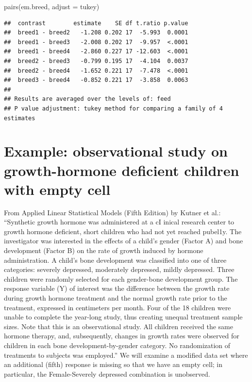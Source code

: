 \documentclass[
]{book}
\newenvironment{Shaded}{\begin{snugshade}}{\end{snugshade}}
\newcommand{\AttributeTok}[1]{\textcolor[rgb]{0.77,0.63,0.00}{#1}}
\newcommand{\FunctionTok}[1]{\textcolor[rgb]{0.00,0.00,0.00}{#1}}
\newcommand{\NormalTok}[1]{#1}
\newcommand{\StringTok}[1]{\textcolor[rgb]{0.31,0.60,0.02}{#1}}
\begin{document}
\begin{Shaded}
\begin{Highlighting}[]
\FunctionTok{pairs}\NormalTok{(em.breed, }\AttributeTok{adjust =} \StringTok{\textquotesingle{}tukey\textquotesingle{}}\NormalTok{)}
\end{Highlighting}
\end{Shaded}

\begin{verbatim}
##  contrast        estimate    SE df t.ratio p.value
##  breed1 - breed2   -1.208 0.202 17  -5.993  0.0001
##  breed1 - breed3   -2.008 0.202 17  -9.957  <.0001
##  breed1 - breed4   -2.860 0.227 17 -12.603  <.0001
##  breed2 - breed3   -0.799 0.195 17  -4.104  0.0037
##  breed2 - breed4   -1.652 0.221 17  -7.478  <.0001
##  breed3 - breed4   -0.852 0.221 17  -3.858  0.0063
## 
## Results are averaged over the levels of: feed 
## P value adjustment: tukey method for comparing a family of 4 estimates
\end{verbatim}

\hypertarget{example-observational-study-on-growth-hormone-deficient-children-with-empty-cell}{%
\section{Example: observational study on growth-hormone deficient children with empty cell}\label{example-observational-study-on-growth-hormone-deficient-children-with-empty-cell}}

From Applied Linear Statistical Models (Fifth Edition) by Kutner et al.:
``Synthetic growth hormone was administered at a cI inical research center to growth hormone deficient, short children who had not yet reached pubel1y. The investigator was interested in the effects of a child's gender (Factor A) and bone development (Factor B) on the rate of growth induced by hormone administration. A child's bone development was classified into one of three categories: severely depressed, moderately depressed, mildly depressed. Three children were randomly selected for each gender-bone development group. The response variable (Y) of interest was the difference between the growth rate during growth hormone treatment and the normal growth rate prior to the treatment, expressed in centimeters per month. Four of the 18 children were unable to complete the year-long study, thus creating unequal treatment sample sizes. Note that this is an observational study. All children received the same hormone therapy, and, subsequently, changes in growth rates were observed for children in each bone development-by-gender category. No randomization of treatments to subjects was employed.''
We will examine a modified data set where an additional (fifth) response is missing so that we have an empty cell; in particular, the Female-Severely depressed combination is unobserved.
\end{document}
